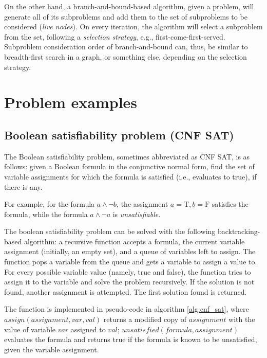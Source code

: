 On the other hand, a branch-and-bound-based algorithm, given a problem,
will generate all of its subproblems and add them to the set of subproblems to be considered
(\emph{live nodes}). On every iteration, the algorithm will select a subproblem from the set,
following a \emph{selection strategy}, e.g., first-come-first-served. Subproblem consideration
order of branch-and-bound can, thus, be similar to breadth-first search in a graph, or
something else, depending on the selection strategy.

\section{Problem examples}

\subsection{Boolean satisfiability problem (CNF SAT)}

The Boolean satisfiability problem, sometimes abbreviated as CNF SAT, is as follows:
given a Boolean formula in the conjunctive normal form, find the set of variable assignments
for which the formula is satisfied (i.e., evaluates to true), if there is any.

For example, for the formula $a \land \neg b$, the assignment $a=\text{T}, b=\text{F}$
satisfies the formula, while the formula $a \land \neg a$ is \emph{unsatisfiable}.

The boolean satisfiability problem can be solved with the following backtracking-based
algorithm: a recursive function accepts a formula, the current variable assignment
(initially, an empty set), and a queue of variables left to assign. The function pops a
variable from the queue and gets a variable to assign a value to. For every possible variable
value (namely, true and false), the function tries to assign it to the variable
and solve the problem recursively. If the solution is not found, another assignment is
attempted. The first solution found is returned.

\sloppy
The function is implemented in pseudo-code in algorithm \ref{alg:cnf_sat},
where $assign(assignment, var, val)$ returns a modified copy of $assignment$ with the value
of variable $var$ assigned to $val$; $unsatisfied(formula, assignment)$ evaluates the formula
and returns true if the formula is known to be unsatisfied, given the variable assignment.

